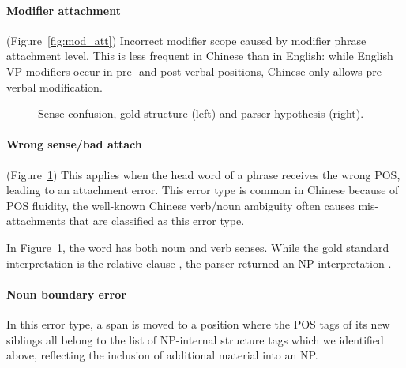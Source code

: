 \paragraph{Modifier attachment} (Figure~\ref{fig:mod_att})  Incorrect modifier
scope caused by modifier phrase attachment level. This is less frequent in
Chinese than in English: while English VP modifiers occur in pre- and
post-verbal positions, Chinese only allows pre-verbal modification.

\begin{figure}
\centering
  \caption[Error analysis example: Word sense confusion (Chinese).]{ \label{fig:sense} 
    Sense confusion, gold structure (left) and parser hypothesis (right).
  }
\end{figure}

\paragraph{Wrong sense/bad attach} (Figure~\ref{fig:sense})
This applies
when the head word of a phrase receives the wrong POS, leading to an attachment
error.  This error type is common in Chinese because of POS fluidity, \myeg the
well-known Chinese verb/noun ambiguity often causes mis-attachments that are
classified as this error type.

In Figure~\ref{fig:sense}, the word \mbox{} has both noun and
verb senses. While the gold standard interpretation is the relative clause
\mbox{}, the parser returned an NP
interpretation \mbox{}.

\paragraph{Noun boundary error}  In this error type, a span is moved to a
position where the POS tags of its new siblings all belong to the
list of NP-internal structure tags which we identified above, reflecting
the inclusion of additional material into an NP.

